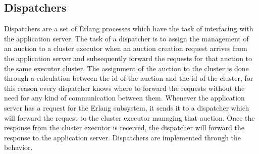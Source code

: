 \subsection{Dispatchers}\label{subsec:archdispatchers}

Dispatchers are a set of Erlang processes which have the task of interfacing
with the application server. The task of a dispatcher is to assign the
management of an auction to a cluster executor when an auction creation request
arrives from the application server and subsequently forward the requests for
that auction to the same executor cluster. The assignment of the auction to the
cluster is done through a calculation between the id of the auction and the id
of the cluster, for this reason every dispatcher knows where to forward the
requests without the need for any kind of communication between them. Whenever
the application server has a request for the Erlang subsystem, it sends it to a
dispatcher which will forward the request to the cluster executor managing that
auction. Once the response from the cluster executor is received, the dispatcher
will forward the response to the application server. Dispatchers are implemented
through the  behavior.
